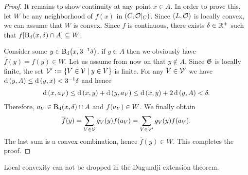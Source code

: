 \begin{proof}
	It remains to show continuity at any point $x \in A$. In order to prove this, let $W$ be any neighborhood of $f(x)$ in $\reltspace[C][O]$. Since $\tspace[L][O]$ is locally convex, we can assume \Wlog that $W$ is convex. Since $f$ is continuous, there exists $\delta \in \R^+$ such that $f\bbraces{\ball[x][\delta][\metric] \cap A} \subseteq W$.
	
	Consider some $y \in \ball[x][3^{-1}\delta][\metric]$. if $y \in A$ then we obviously have $\overline{f}(y) = f(y) \in W$. Let us assume from now on that $y \notin A$. Since $\partition[G]$ is locally finite, the set $\cover[V]^\prime := \Bbraces{V \in \cover[V] \mid y \in V}$ is finite. For any $V \in \cover[V]^\prime$ we have $\metric\pbraces{y, A} \leq \metric\pbraces{y, x} < 3^{-1}\delta$ and hence
	\begin{align*}
		\metric\pbraces{x, a_V} \leq \metric\pbraces{x, y} + \metric\pbraces{y, a_V} \leq \metric\pbraces{x, y} + 2 \metric\pbraces{y, A} < \delta.
	\end{align*}
	Therefore, $a_V \in \ball[x][\delta][\metric] \cap A$ and $f\pbraces{a_V} \in W$. We finally obtain
	\begin{align*}
		\overline{f}(y) = \sum_{V \in \cover[V]} g_V(y) f(a_V) = \sum_{V \in \cover[V]^\prime} g_V(y) f(a_V).
	\end{align*}
	The last sum is a convex combination, hence $\overline{f}(y) \in W$. This completes the proof. 
\end{proof}

\begin{remark}
	Local convexity can not be dropped in the Dugundji extension theorem.\cite[remark1.2.4]{IDT}
\end{remark}
